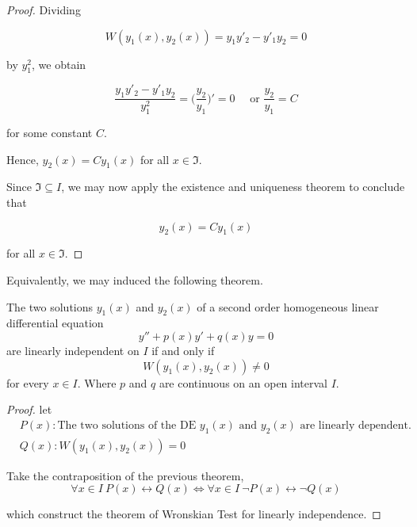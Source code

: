 \begin{proof}
     Dividing 

     \[
        W(y_1(x), y_2(x)) = y_1y'_2 - y'_1y_2 = 0
     \]

     by $y_1^2$, we obtain 

     \[
        \frac{y_1y'_2 - y'_1y_2}{y_1^2} = \biggl( \frac{y_2}{y_1} \biggr)' = 0 \quad 
        \text{ or } \frac{y_2}{y_1} = C
     \]

     for some constant $C$. 

     Hence, $y_2(x) = Cy_1(x)$ for all $x \in \mathfrak{I}$.

     Since $\mathfrak{I} \subseteq I$, we may now apply the existence and uniqueness theorem to conclude that 

     \[
        y_2(x) = Cy_1(x)
     \]

     for all $x \in \mathfrak{I}$.
\end{proof}

Equivalently, we may induced the following theorem.

\begin{theorem}
    The two solutions $y_1(x)$ and $y_2(x)$ of a second order homogeneous linear 
    differential equation
    \begin{equation}
        y'' + p(x)y' + q(x)y = 0
    \end{equation}
    are linearly independent on $I$ if and only if 
    \begin{equation}
        W(y_1(x), y_2(x)) \neq 0
    \end{equation}
    for every $x \in I$. Where $p$ and $q$ are continuous on an open interval $I$.
\end{theorem}

\begin{proof}
    let
    \begin{align*}
        &P(x): \text{The two solutions of the DE } y_1(x) \text{ and } y_2(x) \text{ are linearly dependent.}\\
        &Q(x): W(y_1(x), y_2(x)) = 0
    \end{align*}

    Take the contraposition of the previous theorem,
    \begin{equation}
        \forall x \in I \> P(x) \leftrightarrow Q(x) \Longleftrightarrow \forall x \in I \> \lnot P(x) \leftrightarrow \lnot Q(x)
    \end{equation}

    which construct the theorem of Wronskian Test for linearly independence.
\end{proof}


